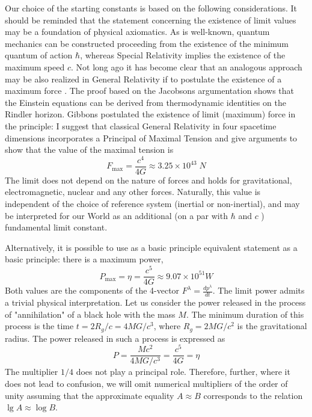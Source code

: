 \documentclass [12pt]{article}
\begin{document}
Our choice of the starting constants is based on the following considerations. It should  be reminded that the statement concerning the existence of limit values may be a foundation  of physical  axiomatics.  As is well-known, quantum mechanics can be constructed proceeding from the existence of the minimum quantum of action $\hbar $, whereas Special Relativity  implies the existence of the maximum speed $c$. Not long ago it has become clear that an analogous approach may be also realized in General Relativity  if to postulate the existence of a maximum force \cite{s11}. The proof  based on the Jacobsons argumentation \cite{s12} shows that the Einstein equations can be derived from thermodynamic identities on the Rindler horizon.  Gibbons \cite{s13} postulated the existence of limit  (maximum) force  in the  principle: I suggest that classical General Relativity in four spacetime dimensions incorporates a Principal of Maximal Tension and give arguments to show that the value of the maximal tension is
\begin{equation}\label{e1}
  {F_{\max }} = \frac{{{c^4}}}{{4G}} \approx 3.25 \times {10^{43}}\;N
\end{equation}
The limit does not depend on the nature of forces and holds for gravitational, electromagnetic, nuclear and any other forces. Naturally, this value is independent of the choice of  reference system  (inertial or non-inertial), and may be interpreted for our World as an additional  (on a par with   $\hbar $ and $c$ ) fundamental limit constant.

Alternatively, it is possible to use as a basic principle equivalent statement as a basic principle:
there is a maximum power,
\begin{equation}\label{e2}
  {P_{\max }} = \eta  = \frac{{{c^5}}}{{4G}} \approx 9.07 \times {10^{51}}W
\end{equation}
Both values are the components of the 4-vector  ${F^\lambda } = \frac{{d{p^\lambda }}}{{dt}}$. The limit power admits a trivial physical interpretation. Let us consider the power released in the process of  "annihilation" of a black hole with the mass $M$. The minimum duration of this process is the  time  $t = 2{R_g}/c = 4MG/{c^3}$, where ${R_g} = 2MG/{c^2}$ is the gravitational radius.     The power released in such a process is expressed as
\begin{equation}\label{e3}
  P = \frac{{M{c^2}}}{{4MG/{c^3}}} = \frac{{{c^5}}}{{4G}} = \eta
\end{equation}
The multiplier  $1/4$ does not play a principal role. Therefore, further,  where it does not lead to confusion,  we will omit numerical multipliers of the order of unity  assuming that the approximate equality $A \approx B$ corresponds to the relation $\lg A \approx \log B$.
\end{document}
